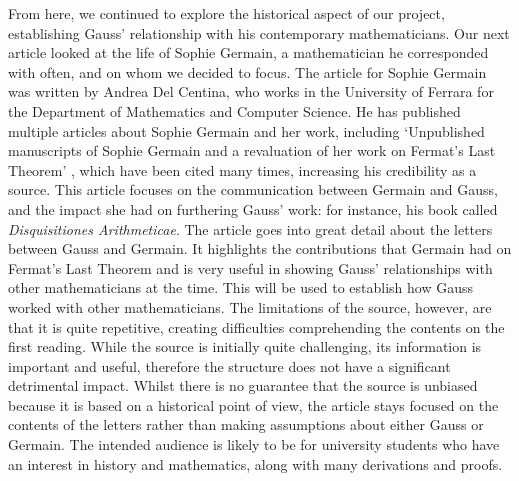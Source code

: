 \documentclass{article}
\begin{document}
From here, we continued to explore the historical aspect of our project, establishing Gauss' relationship with his contemporary mathematicians. Our next article looked at the life of Sophie Germain, a mathematician he corresponded with often, and on whom we decided to focus. The article \cite{germaincorrespondence} for Sophie Germain was written by Andrea Del Centina, who works in the University of Ferrara for the Department of Mathematics and Computer Science. He has published multiple articles about Sophie Germain and her work, including `Unpublished manuscripts of Sophie Germain and a revaluation of her work on Fermat's Last Theorem' \cite{germainmanuscripts}, which have been cited many times, increasing his credibility as a source. This article focuses on the communication between Germain and Gauss, and the impact she had on furthering Gauss' work: for instance, his book called \textit{Disquisitiones Arithmeticae}. The article goes into great detail about the letters between Gauss and Germain. It highlights the contributions that Germain had on Fermat's Last Theorem and is very useful in showing Gauss' relationships with other mathematicians at the time. This will be used to establish how Gauss worked with other mathematicians. The limitations of the source, however, are that it is quite repetitive, creating difficulties comprehending the contents on the first reading. While the source is initially quite challenging, its information is important and useful, therefore the structure does not have a significant detrimental impact. Whilst there is no guarantee that the source is unbiased because it is based on a historical point of view, the article stays focused on the contents of the letters rather than making assumptions about either Gauss or Germain. The intended audience is likely to be for university students who have an interest in history and mathematics, along with many derivations and proofs. 
\end{document}
